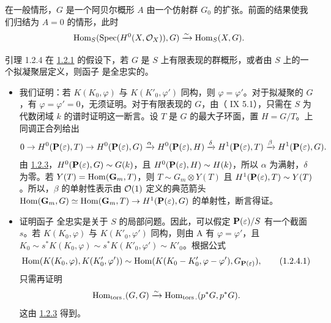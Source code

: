 在一般情形，$G$ 是一个阿贝尔概形 $A$ 由一个仿射群 $G_0$ 的扩张。前面的结果使我们归结为 $A=0$ 的情形，此时
$$
\operatorname{Hom}_{S}(\operatorname{Spec} (H^0(X,{\mathcal O}_{X})),G)\xrightarrow{\sim}
\operatorname{Hom}_{S}(X,G){}.
$$

\begin{enonce*}{引理 1.2.4}
在 \hyperref[XVIII.subsubsec1.2.1]{1.2.1} 的假设下，若 $G$ 是 $S$ 上有限表现的群概形，或者由 $S$ 上的一个拟凝聚层定义，则函子  是全忠实的。
\end{enonce*}

\begin{itemize}
\item[A.] 我们证明：若 $K(K_{0},\varphi)$ 与 $K(K'_0,\varphi')$ 同构，则 $\varphi=\varphi'$。对于拟凝聚的 $G$，有 $\varphi=\varphi'=0$，无须证明。对于有限表现的 $G$，由（ IX 5.1），只需\pageoriginale{}在 $S$ 为代数闭域 $k$ 的谱时证明这一断言。设 $T$ 是 $G$ 的最大子环面，置 $H=G/T$。上同调正合列给出
$$
0\rightarrow H^{0}(\mathbf{P}(\varepsilon),T)\rightarrow
H^{0}(\mathbf{P}(\varepsilon),G) \xrightarrow{\alpha}
H^{0}(\mathbf{P}(\varepsilon),H)
 \xrightarrow{\delta}
H^{1}(\mathbf{P}(\varepsilon),T)\xrightarrow{\beta}H^{1}(\mathbf{P}(\varepsilon),G){}.
$$
由 \hyperref[XVIII.lem1.2.3]{1.2.3}，$H^0(\mathbf{P}(\varepsilon),G)\sim G(k)$，且 $H^0(\mathbf{P}(\varepsilon),H)\sim H(k)$，所以 $\alpha$ 为满射，$\delta$ 为零。若 $Y(T)=\operatorname{Hom}(\mathbf{G}_{m},T)$，则 $T\sim G_{m}\otimes Y(T)$ 且 $H^{1}(\mathbf{P}(\varepsilon),T)\sim Y(T)$。所以，$\beta$ 的单射性表示由 ${\mathcal O}(1)$ 定义的典范箭头 $\operatorname{Hom}(\mathbf{G}_{m},G)\simeq \operatorname{Hom}(\mathbf{G}_{m},T)\rightarrow H^{1}(\mathbf{P}(\varepsilon),G)$ 的单射性，断言得证。

\item[B.] 证明函子  全忠实是关于 $S$ 的局部问题。因此，可以假定 $\mathbf{P}(\varepsilon)/S$ 有一个截面 $s$。若 $K(K_{0},\varphi)$ 与 $K(K'_{0},\varphi')$ 同构，则由 A 有 $\varphi=\varphi'$，且 $K_{0}\sim s^{\ast}K(K_{0},\varphi)\sim s^{\ast}K(K'_{0},\varphi')\sim K'_{0}$。根据公式
\begin{equation*}
\operatorname{Hom} (K(K_{0},\varphi), K(K'_{0},\varphi'))\sim \operatorname{Hom}(K(K_{0}-K'_{0},\varphi-\varphi'),G_{\mathbf{P}(\varepsilon)}){},\tag{1.2.4.1}
\end{equation*}%
只需再证明
$$
\operatorname{Hom}_{\operatorname{tors}.}(G,G)\xrightarrow{\sim}
\operatorname{Hom}_{\operatorname{tors}.}(p^{\ast}G,p^{\ast}G){}.
$$
这由 \hyperref[XVIII.lem1.2.3]{1.2.3} 得到。
\end{itemize}

